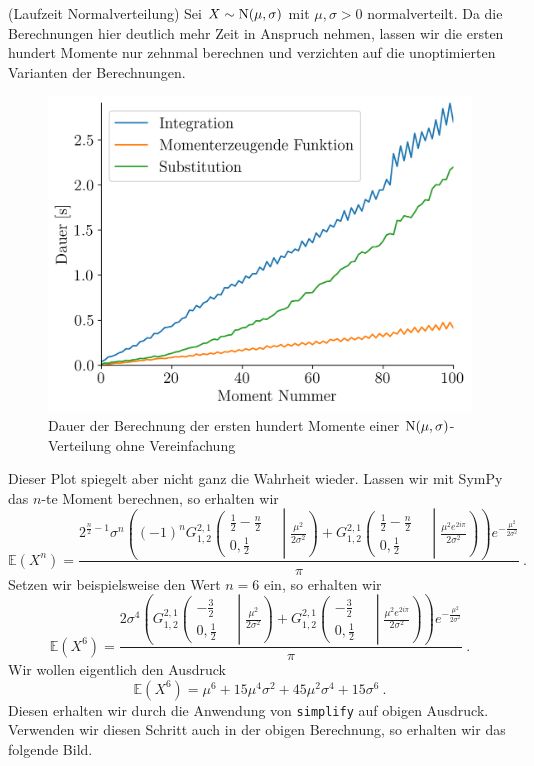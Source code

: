 \begin{Beispiel}{(Laufzeit Normalverteilung)}
Sei $X \sim \operatorname{N}(\mu, \sigma)$ mit $\mu, \sigma > 0$ normalverteilt. Da die Berechnungen hier deutlich mehr Zeit in Anspruch nehmen, lassen wir die ersten hundert Momente nur zehnmal berechnen und  verzichten auf die unoptimierten Varianten der Berechnungen.

\begin{figure}[H]
\centering
\includegraphics[width=0.5\linewidth]{./Section/Momente/Dauer Nor Falsch.png}
\vspace*{-.3\baselineskip}
\caption{Dauer der Berechnung der ersten hundert Momente einer $\operatorname{N}(\mu, \sigma)$-Verteilung ohne Vereinfachung}
\end{figure}

Dieser Plot spiegelt aber nicht ganz die Wahrheit wieder. Lassen wir mit SymPy das $n$-te Moment berechnen, so erhalten wir
\[\mathbb{E}(X^n) = \frac{2^{\frac{n}{2} - 1} \sigma^{n} \left(\left(-1\right)^{n} {G_{1, 2}^{2, 1}\left(\begin{matrix} \frac{1}{2} - \frac{n}{2} &  \\0, \frac{1}{2} &  \end{matrix} \middle| {\frac{\mu^{2}}{2 \sigma^{2}}} \right)} + {G_{1, 2}^{2, 1}\left(\begin{matrix} \frac{1}{2} - \frac{n}{2} &  \\0, \frac{1}{2} &  \end{matrix} \middle| {\frac{\mu^{2} e^{2 i \pi}}{2 \sigma^{2}}} \right)}\right) e^{- \frac{\mu^{2}}{2 \sigma^{2}}}}{\pi}~.\]
Setzen wir beispielsweise den Wert $n = 6$ ein, so erhalten wir
\[\mathbb{E}(X^6) = \frac{2 \sigma^{4} \left({G_{1, 2}^{2, 1}\left(\begin{matrix} - \frac{3}{2} &  \\0, \frac{1}{2} &  \end{matrix} \middle| {\frac{\mu^{2}}{2 \sigma^{2}}} \right)} + {G_{1, 2}^{2, 1}\left(\begin{matrix} - \frac{3}{2} &  \\0, \frac{1}{2} &  \end{matrix} \middle| {\frac{\mu^{2} e^{2 i \pi}}{2 \sigma^{2}}} \right)}\right) e^{- \frac{\mu^{2}}{2 \sigma^{2}}}}{\pi}~.\]
Wir wollen eigentlich den Ausdruck
\[\mathbb{E}(X^6) = \mu^6 + 15 \mu^4 \sigma^2 + 45 \mu^2 \sigma^4 + 15 \sigma^6~.\]
Diesen erhalten wir durch die Anwendung von \lstinline|simplify| auf obigen Ausdruck. Verwenden wir diesen Schritt auch in der obigen Berechnung, so erhalten wir das folgende Bild.


\end{Beispiel}
